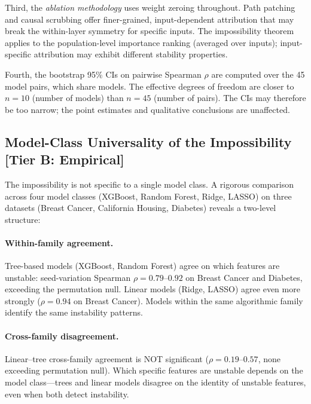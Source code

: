 \documentclass[11pt,a4paper]{article}
\begin{document}
Third, the \emph{ablation methodology} uses weight zeroing throughout.  Path patching~\cite{goldowskydill2023localizing} and causal scrubbing offer finer-grained, input-dependent attribution that may break the within-layer symmetry for specific inputs.  The impossibility theorem applies to the population-level importance ranking (averaged over inputs); input-specific attribution may exhibit different stability properties.

Fourth, the bootstrap 95\% CIs on pairwise Spearman $\rho$ are computed over the 45 model pairs, which share models.  The effective degrees of freedom are closer to $n = 10$ (number of models) than $n = 45$ (number of pairs).  The CIs may therefore be too narrow; the point estimates and qualitative conclusions are unaffected.

\subsection{Model-Class Universality of the Impossibility\,\textnormal{\normalsize[Tier B: Empirical]}}
\label{sec:model-class}

The impossibility is not specific to a single model class.  A rigorous comparison across four model classes (XGBoost, Random Forest, Ridge, LASSO) on three datasets (Breast Cancer, California Housing, Diabetes) reveals a two-level structure:

\paragraph{Within-family agreement.}
Tree-based models (XGBoost, Random Forest) agree on which features are unstable: seed-variation Spearman $\rho = 0.79$--$0.92$ on Breast Cancer and Diabetes, exceeding the permutation null.  Linear models (Ridge, LASSO) agree even more strongly ($\rho = 0.94$ on Breast Cancer).  Models within the same algorithmic family identify the same instability patterns.

\paragraph{Cross-family disagreement.}
Linear--tree cross-family agreement is NOT significant ($\rho = 0.19$--$0.57$, none exceeding permutation null).  Which specific features are unstable depends on the model class---trees and linear models disagree on the identity of unstable features, even when both detect instability.
\end{document}

